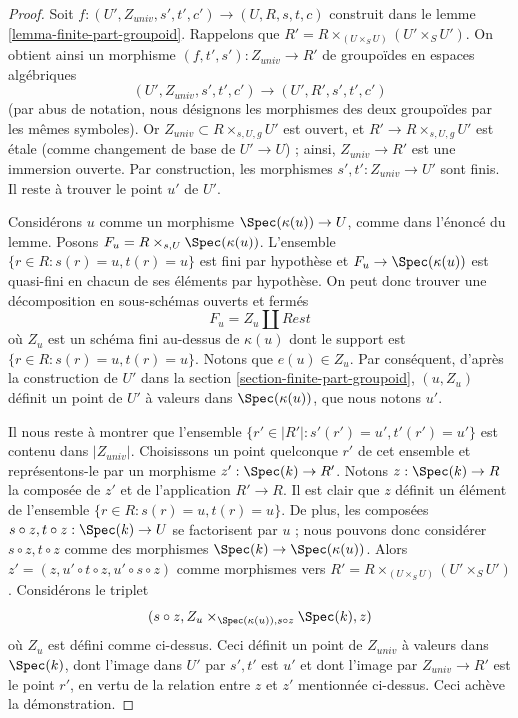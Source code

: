 \begin{proof}
Soit $f : (U', Z_{univ}, s', t', c') \to (U, R, s, t, c)$ construit dans le
lemme \ref{lemma-finite-part-groupoid}.
Rappelons que $R' = R \times_{(U \times_S U)} (U' \times_S U')$.
On obtient ainsi un morphisme $(f, t', s') : Z_{univ} \to R'$ de groupoïdes
en espaces algébriques
$$
(U', Z_{univ}, s', t', c') \to (U', R', s', t', c')
$$
(par abus de notation, nous désignons les morphismes des deux groupoïdes
par les mêmes symboles). Or $Z_{univ} \subset R \times_{s, U, g} U'$ est ouvert,
et $R' \to R \times_{s, U, g} U'$ est \'etale (comme changement de base
de $U' \to U$) ; ainsi, $Z_{univ} \to R'$ est une immersion ouverte.
Par construction, les morphismes $s', t' : Z_{univ} \to U'$ sont finis.
Il reste à trouver le point $u'$ de $U'$.

\medskip\noindent
Considérons $u$ comme un morphisme $\Spec(\kappa(u)) \to U$, comme dans
l'énoncé du lemme. Posons $F_u = R \times_{s, U} \Spec(\kappa(u))$.
L'ensemble $\{r \in R : s(r) = u, t(r) = u\}$ est fini par hypothèse
et $F_u \to \Spec(\kappa(u))$ est quasi-fini en chacun
de ses éléments par hypothèse. On peut donc trouver une décomposition en
sous-schémas ouverts et fermés
$$
F_u = Z_u \amalg Rest
$$
où $Z_u$ est un schéma fini au-dessus de $\kappa(u)$ dont le support est
$\{r \in R : s(r) = u, t(r) = u\}$. Notons que $e(u) \in Z_u$.
Par conséquent, d'après la construction de $U'$ dans la
section \ref{section-finite-part-groupoid},
$(u, Z_u)$ définit un point de $U'$ à valeurs dans
$\Spec(\kappa(u))$, que nous notons $u'$.

\medskip\noindent
Il nous reste à montrer que l'ensemble
$\{r' \in |R'| : s'(r') = u', t'(r') = u'\}$
est contenu dans $|Z_{univ}|$.
Choisissons un point quelconque $r'$ de cet ensemble et représentons-le par
un morphisme $z' : \Spec(k) \to R'$. Notons $z : \Spec(k) \to R$
la composée de $z'$ et de l'application $R' \to R$.
Il est clair que $z$ définit un élément de l'ensemble
$\{r \in R : s(r) = u, t(r) = u\}$.
De plus, les composées $s \circ z, t \circ z : \Spec(k) \to U$
se factorisent par $u$ ; nous pouvons donc considérer $s \circ z, t \circ z$
comme des morphismes $\Spec(k) \to \Spec(\kappa(u))$. Alors
$z' = (z, u' \circ t \circ z, u'\circ s \circ z)$ comme morphismes vers
$R' = R \times_{(U \times_S U)} (U' \times_S U')$.
Considérons le triplet
$$
(s \circ z, Z_u \times_{\Spec(\kappa(u)), s \circ z} \Spec(k), z)
$$
où $Z_u$ est défini comme ci-dessus. Ceci définit un point de $Z_{univ}$
à valeurs dans $\Spec(k)$, dont l'image dans $U'$ par $s', t'$ est $u'$ et
dont l'image par
$Z_{univ} \to R'$ est le point $r'$, en vertu de la relation entre
$z$ et $z'$ mentionnée ci-dessus.
Ceci achève la démonstration.
\end{proof}

